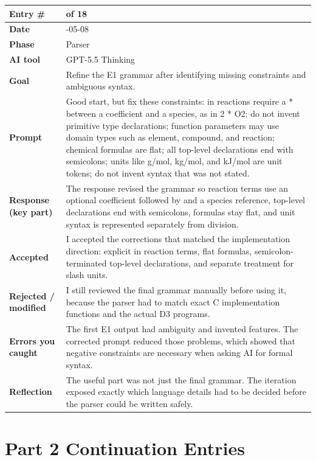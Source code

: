 \documentclass[11pt,a4paper]{article}
\newcommand{\code}[1]{\texttt{\detokenize{#1}}}
\newcommand{\entrygap}{\vspace{8pt}}
\newenvironment{journalentry}{%
  \begin{center}\small\renewcommand{\arraystretch}{1.22}%
  \begin{tabular}{|>{\columncolor{anscodebg}\bfseries}p{3.0cm}|>{\RaggedRight\arraybackslash}p{12.25cm}|}%
  \hline
}{%
  \end{tabular}\end{center}\entrygap
}
\begin{document}
\begin{journalentry}
Entry \# & 12 of 18 \\ \hline
Date & 2026-05-08 \\ \hline
Phase & Parser \\ \hline
AI tool & GPT-5.5 Thinking \\ \hline
Goal & Refine the E1 grammar after identifying missing constraints and ambiguous syntax. \\ \hline
Prompt & Good start, but fix these constraints: in reactions require a * between a coefficient and a species, as in 2 * O2; do not invent primitive type declarations; function parameters may use domain types such as element, compound, and reaction; chemical formulas are flat; all top-level declarations end with semicolons; units like g/mol, kg/mol, and kJ/mol are unit tokens; do not invent syntax that was not stated. \\ \hline
Response (key part) & The response revised the grammar so reaction terms use an optional coefficient followed by \code{*} and a species reference, top-level declarations end with semicolons, formulas stay flat, and unit syntax is represented separately from division. \\ \hline
Accepted & I accepted the corrections that matched the implementation direction: explicit \code{*} in reaction terms, flat formulas, semicolon-terminated top-level declarations, and separate treatment for slash units. \\ \hline
Rejected / modified & I still reviewed the final grammar manually before using it, because the parser had to match exact C implementation functions and the actual D3 programs. \\ \hline
Errors you caught & The first E1 output had ambiguity and invented features. The corrected prompt reduced those problems, which showed that negative constraints are necessary when asking AI for formal syntax. \\ \hline
Reflection & The useful part was not just the final grammar. The iteration exposed exactly which language details had to be decided before the parser could be written safely. \\ \hline
\end{journalentry}

\section{Part 2 Continuation Entries}
\end{document}
